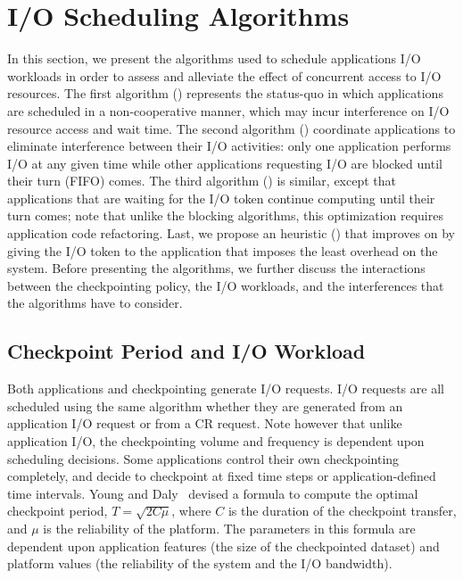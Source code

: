 
\section{I/O Scheduling Algorithms}
\label{sec:algorithms}

In this section, we present the algorithms used to schedule applications
I/O workloads in order to assess and alleviate the effect of concurrent access
to I/O resources. The first algorithm (\nocoop) represents the status-quo
in which applications are scheduled in a non-cooperative manner, which may
incur interference on I/O resource access and wait time. The second
algorithm (\fifoblock) coordinate applications to eliminate interference
between their I/O activities: only one application performs I/O at any given
time while other applications requesting I/O are blocked until their
turn (FIFO) comes. The third algorithm (\fifononblock) is similar, except
that applications that are waiting for the I/O token
continue computing until their turn comes; note that unlike the
blocking algorithms, this optimization requires
application code refactoring. Last, we propose an heuristic
(\leastwaste) that improves on \fifononblock by giving the I/O token
to the application that imposes the least overhead on the system. Before
presenting the algorithms, we further discuss the interactions between
the checkpointing policy, the I/O workloads, and the interferences that the
algorithms have to consider.


\subsection{Checkpoint Period and I/O Workload}

Both applications and checkpointing generate I/O requests. I/O requests
are all scheduled using the same algorithm whether they
are generated from an application I/O request or from a CR
request. Note however that unlike application I/O, the checkpointing
volume and frequency is dependent upon scheduling decisions.
Some applications
control their own checkpointing completely, and decide to checkpoint at
fixed time steps or application-defined time intervals.
Young and Daly~\cite{young74,daly04} devised a formula to compute the optimal
checkpoint period, $T=\sqrt{2 C \mu}$, where $C$ is the duration of the
checkpoint transfer, and $\mu$ is the reliability of the platform.
The parameters in this formula are dependent upon application features
(the size of the checkpointed dataset) and platform values (the reliability
of the system and the I/O bandwidth).

